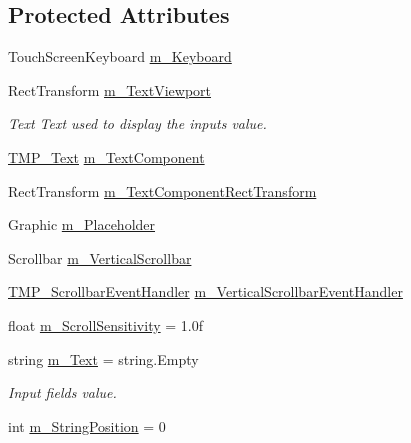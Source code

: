 \subsection*{Protected Attributes}
\begin{DoxyCompactItemize}
\item 
Touch\+Screen\+Keyboard \mbox{\hyperlink{class_t_m_pro_1_1_t_m_p___input_field_a54d6e4dd9823a169ee043b0b1666bb3f}{m\+\_\+\+Keyboard}}
\item 
Rect\+Transform \mbox{\hyperlink{class_t_m_pro_1_1_t_m_p___input_field_a9fd2bebbbaf2c101dc1b449cb8ab0d20}{m\+\_\+\+Text\+Viewport}}
\begin{DoxyCompactList}\small\item\em Text Text used to display the input\textquotesingle{}s value. \end{DoxyCompactList}\item 
\mbox{\hyperlink{class_t_m_pro_1_1_t_m_p___text}{T\+M\+P\+\_\+\+Text}} \mbox{\hyperlink{class_t_m_pro_1_1_t_m_p___input_field_a44ea9a4d415404140ed245e28f8a589c}{m\+\_\+\+Text\+Component}}
\item 
Rect\+Transform \mbox{\hyperlink{class_t_m_pro_1_1_t_m_p___input_field_adbd686703ef2fd1f51a620aacf112dbc}{m\+\_\+\+Text\+Component\+Rect\+Transform}}
\item 
Graphic \mbox{\hyperlink{class_t_m_pro_1_1_t_m_p___input_field_a1b11b8b2838c990e39234868d969922d}{m\+\_\+\+Placeholder}}
\item 
Scrollbar \mbox{\hyperlink{class_t_m_pro_1_1_t_m_p___input_field_a72bb99d7d3c24889ba474b9957b87c86}{m\+\_\+\+Vertical\+Scrollbar}}
\item 
\mbox{\hyperlink{class_t_m_pro_1_1_t_m_p___scrollbar_event_handler}{T\+M\+P\+\_\+\+Scrollbar\+Event\+Handler}} \mbox{\hyperlink{class_t_m_pro_1_1_t_m_p___input_field_a44b82f1f901c2db14d9d584a834f6b1f}{m\+\_\+\+Vertical\+Scrollbar\+Event\+Handler}}
\item 
float \mbox{\hyperlink{class_t_m_pro_1_1_t_m_p___input_field_a11ee0e78a149f3a7834002859bfbbd5b}{m\+\_\+\+Scroll\+Sensitivity}} = 1.\+0f
\item 
string \mbox{\hyperlink{class_t_m_pro_1_1_t_m_p___input_field_a925d3f2771b9953684628c73b48b4d1e}{m\+\_\+\+Text}} = string.\+Empty
\begin{DoxyCompactList}\small\item\em Input field\textquotesingle{}s value. \end{DoxyCompactList}\item 
int \mbox{\hyperlink{class_t_m_pro_1_1_t_m_p___input_field_a31d3a28972c4d3c6e1f7118538dfce8d}{m\+\_\+\+String\+Position}} = 0

\end{DoxyCompactItemize}
